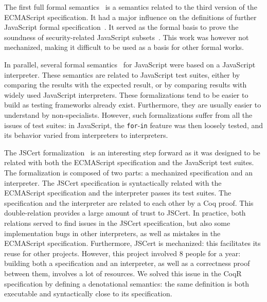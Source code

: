 \documentclass[
    sigplan,
    10pt,
    review, %
    natbib=false %
 ]{acmart}
\newcommand\CoqR{CoqR}
\begin{document}
The first full formal semantics~\parencite{aplas08}
is a semantics related to the third version of the ECMAScript specification.
It had a major influence on the definitions of further JavaScript formal
specification~\parencite{ses, popl14jscert, popl12-Towards, usenix}.
It served as the formal basis to prove the soundness of security-related
JavaScript subsets~\parencite{MMT-CSF-TR09, mmt-esorics09, mmt-oakland10}.
This work was however not mechanized, making it difficult to be used
as a basis for other formal works.

In parallel, several formal semantics~\parencite{js-ml, Guha2010, Politz:S5, kjs}
for JavaScript were based on a JavaScript interpreter.
These semantics are related to JavaScript test suites,
either by comparing the results with the expected result,
or by comparing results with widely used JavaScript interpreters.
These formalizations tend to be easier to build
as testing frameworks already exist.
Furthermore, they are usually easier to understand by non-specialists.
However, such formalizations suffer from all the issues of test suites:
in JavaScript, the \texttt{for}-\texttt{in}
feature was then loosely tested,
and its behavior varied from interpreters to interpreters.

The JSCert formalization~\parencite{popl14jscert}
is an interesting step forward as it was designed
to be related with both the ECMAScript specification and the JavaScript test suites.
The formalization is composed of two parts:
a mechanized specification and an interpreter.
The JSCert specification is syntactically related with the ECMAScript specification
and the interpreter passes its test suites.
The specification and the interpreter are related to each other by a Coq proof.
This double-relation provides a large amount of trust to JSCert.
In practice, both relations served to find issues in the JSCert specification,
but also some implementation bugs in other interpreters,
as well as mistakes in the ECMAScript specification.
Furthermore, JSCert is mechanized:
this facilitates its reuse for other projects.
However, this project involved 8 people for a year:
building both a specification and an interpreter,
as well as a correctness proof between them, involves a lot of resources.
We solved this issue in the \CoqR{} specification
by defining a denotational semantics:
the same definition is both executable and syntactically close to its specification.
\end{document}
